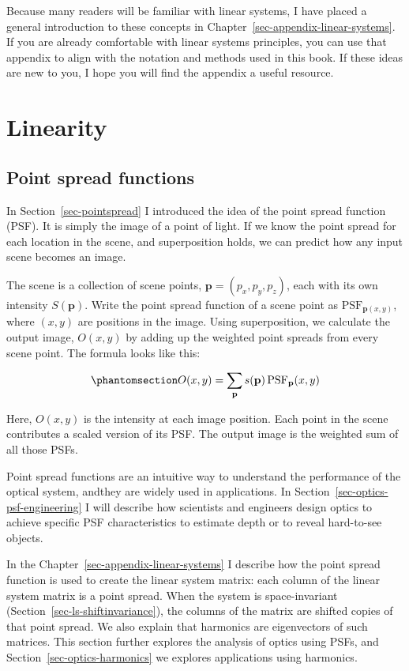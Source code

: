 \documentclass[
  letterpaper,
]{book}
\begin{document}
Because many readers will be familiar with linear systems, I have placed
a general introduction to these concepts in
Chapter~\ref{sec-appendix-linear-systems}. If you are already
comfortable with linear systems principles, you can use that appendix to
align with the notation and methods used in this book. If these ideas
are new to you, I hope you will find the appendix a useful resource.

\section{Linearity}\label{linearity}

\subsection{Point spread functions}\label{sec-pointspread-2}

In Section~\ref{sec-pointspread} I introduced the idea of the point
spread function (PSF). It is simply the image of a point of light. If we
know the point spread for each location in the scene, and superposition
holds, we can predict how any input scene becomes an image.

The scene is a collection of scene points,
\(\mathbf{p} = (p_x, p_y, p_z)\), each with its own intensity
\(S(\mathbf{p})\). Write the point spread function of a scene point as
\(\text{PSF}_{\mathbf{p}(x, y)}\), where \((x, y)\) are positions in the
image. Using superposition, we calculate the output image, \(O(x,y)\) by
adding up the weighted point spreads from every scene point. The formula
looks like this:

\begin{equation}\phantomsection\label{eq-pointspread-1}{
O(x, y) = \sum_{\mathbf{p}} s(\mathbf{p})\, \text{PSF}_{\mathbf{p}}(x, y)
}\end{equation}

Here, \(O(x, y)\) is the intensity at each image position. Each point in
the scene contributes a scaled version of its PSF. The output image is
the weighted sum of all those PSFs.

Point spread functions are an intuitive way to understand the
performance of the optical system, andthey are widely used in
applications. In Section~\ref{sec-optics-psf-engineering} I will
describe how scientists and engineers design optics to achieve specific
PSF characteristics to estimate depth or to reveal hard-to-see objects.

In the Chapter~\ref{sec-appendix-linear-systems} I describe how the
point spread function is used to create the linear system matrix: each
column of the linear system matrix is a point spread. When the system is
space-invariant (Section~\ref{sec-ls-shiftinvariance}), the columns of
the matrix are shifted copies of that point spread. We also explain that
harmonics are eigenvectors of such matrices. This section further
explores the analysis of optics using PSFs, and
Section~\ref{sec-optics-harmonics} we explores applications using
harmonics.
\end{document}
